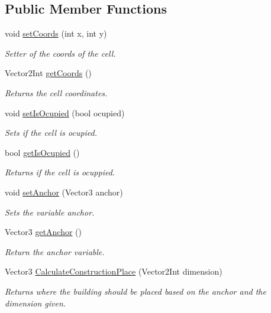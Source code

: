 \subsection*{Public Member Functions}
\begin{DoxyCompactItemize}
\item 
void \mbox{\hyperlink{class_cell_a2943d1c01e920a04f78bd48bbb1db9b1}{set\+Coords}} (int x, int y)
\begin{DoxyCompactList}\small\item\em Setter of the coords of the cell. \end{DoxyCompactList}\item 
Vector2\+Int \mbox{\hyperlink{class_cell_ac964517dec897f8cbef491e6942603dd}{get\+Coords}} ()
\begin{DoxyCompactList}\small\item\em Returns the cell coordinates. \end{DoxyCompactList}\item 
void \mbox{\hyperlink{class_cell_a901695c1fdd8d8dde6601cbe60a19f6c}{set\+Is\+Ocupied}} (bool ocupied)
\begin{DoxyCompactList}\small\item\em Sets if the cell is ocupied. \end{DoxyCompactList}\item 
bool \mbox{\hyperlink{class_cell_af88aea83835a3e1c6bbf339a945fc994}{get\+Is\+Ocupied}} ()
\begin{DoxyCompactList}\small\item\em Returns if the cell is ocuppied. \end{DoxyCompactList}\item 
void \mbox{\hyperlink{class_cell_af6990e51b59b0b2b3ad5a20437c3d527}{set\+Anchor}} (Vector3 anchor)
\begin{DoxyCompactList}\small\item\em Sets the variable anchor. \end{DoxyCompactList}\item 
Vector3 \mbox{\hyperlink{class_cell_a8cb44e58153a75e75ee98790f51616e8}{get\+Anchor}} ()
\begin{DoxyCompactList}\small\item\em Return the anchor variable. \end{DoxyCompactList}\item 
Vector3 \mbox{\hyperlink{class_cell_a924b6308bc7956563759d9bd2605850e}{Calculate\+Construction\+Place}} (Vector2\+Int dimension)
\begin{DoxyCompactList}\small\item\em Returns where the building should be placed based on the anchor and the dimension given. \end{DoxyCompactList}\item 

\end{DoxyCompactItemize}

